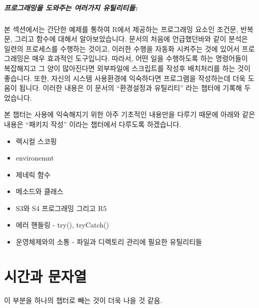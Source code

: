 
\paragraph{프로그래밍을 도와주는 여러가지 유틸리티들: } 

본 섹션에서는 간단한 예제를 통하여 R에서 제공하는 프로그래밍 요소인 조건문, 반복문, 그리고 함수에 대해서 알아보았습니다. 
문서의 처음에 언급했던바와 같이 분석은 일련의 프로세스를 수행하는 것이고, 이러한 수행을 자동화 시켜주는 것에 있어서 프로그래밍은 매우 효과적인 도구입니다.
따라서, 어떤 일을 수행하도록 하는 명령어들이 복잡해지고 그 양이 많아진다면 외부파일에 스크립트를 작성후 배치처리를 하는 것이 좋습니다.
또한, 자신의 시스템 사용환경에 익숙하다면 프로그램을 작성하는데 더욱 도움이 됩니다. 
이러한 내용은 이 문서의 ``환경설정과 유틸리티'' 라는 챕터에 기록해 두었습니다. 

본 챕터는 사용에 익숙해지기 위한 아주 기초적인 내용만을 다루기 때문에 아래와 같은 내용은 ``패키지 작성'' 이라는 챕터에서 다루도록 하겠습니다. 

\begin{itemize}
	\item 렉시컬 스코핑 
	\item environemnt
	\item 제네릭 함수 
	\item 메소드와 클래스 
	\item S3와 S4 프로그래밍 그리고 R5
	\item 에러 핸들링 - try(), tryCatch()
	\item 운영체제와의 소통 - 파일과 디렉토리 관리에 필요한 유틸리티들 
\end{itemize}



\chapter{시간과 문자열}

이 부분을 하나의 챕터로 빼는 것이 더욱 나을 것 같음.


